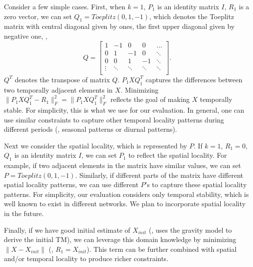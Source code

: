 Consider a few simple cases. First, when
$k=1$, $P_1$ is an identity matrix $I$, $R_1$ is a zero vector, we can
set $Q_1=Toeplitz(0,1,-1)$, which denotes the Toeplitz matrix with
central diagonal given by ones, the first upper diagonal given by
negative one, \ie,
\begin{equation}
  Q = \left[
   \begin{array}{rrrrrrrr}
         1 & -1 &  0 &  0 &  \ldots \\
         0 &  1 & -1 &  0 & \ddots \\
         0 &  0 &  1 & -1 & \ddots \\
         \vdots &  \ddots &  \ddots & \ddots &  \ddots   \\
   \end{array} \right].
\end{equation}
$Q^T$ denotes the transpose of matrix $Q$. $P_1 X Q_1^T$ captures the
differences between two temporally adjacent elements in
$X$. Minimizing $\|P_1 X Q_1^T - R_1\|_F^2=\|P_1 X Q_1^T\|_F^2$
reflects the goal of making $X$ temporally stable. For simplicity,
this is what we use for our evaluation. In general, one can use
similar constraints to capture other temporal locality patterns during
different periods (\eg, seasonal patterns or diurnal patterns).

Next we consider the spatial locality, which is represented by $P$. If
$k=1$, $R_1=0$, $Q_1$ is an identity matrix $I$, we can set $P_1$ to
reflect the spatial locality. For example, if two adjacent elements in
the matrix have similar values, we can set $P =
Toeplitz(0,1,-1)$. Similarly, if different parts of the matrix have
different spatial locality patterns, we can use different $P$'s to
capture these spatial locality patterns. For simplicity, our
evaluation considers only temporal stability, which is well known to
exist in different networks. We plan to incorporate spatial locality
in the future.


Finally, if we have good initial estimate of $X_{init}$ (\eg, \cite{ZRDG03}
uses the gravity model to derive the initial TM), we can
leverage this domain knowledge by minimizing $\|X - X_{init}\|$ (\ie, $R_1=X_{init}$). This
term can be further combined with spatial and/or temporal locality to
produce richer constraints.


